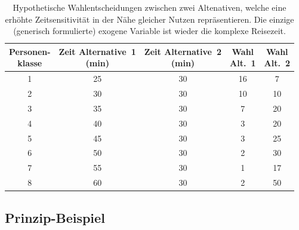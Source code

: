 \begin{table}
\begin{center}
\begin{tabular}{|c||c|c|c|c|} \hline
\myBox{4em}{Personen-\\[-3ex]klasse}
 & \myBox{8em}{Zeit Alternative~1\\(min)}
 & \myBox{8em}{Zeit Alternative~2\\(min)}
 & \myBox{2.5em}{Wahl\\Alt.~1}
 & \myBox{2.5em}{Wahl\\Alt.~2} \\ \hline
1 & 25 & 30 & 16 & 7 \\
2 & 30 & 30 & 10 & 10 \\
3 & 35 & 30 & 7 & 20 \\
4 & 40 & 30 & 3 & 20 \\
5 & 45 & 30 & 3 & 25 \\
6 & 50 & 30 & 2 & 30 \\
7 & 55 & 30 & 1 & 17 \\
8 & 60 & 30 & 2 & 50 \\ \hline
\end{tabular}
\caption{\label{tab:Tversky}Hypothetische Wahlentscheidungen zwischen
  zwei Altenativen, welche eine  erh\"ohte Zeitsensitivit\"at 
in der N\"ahe gleicher Nutzen
repr\"asentieren.
Die einzige
(generisch formulierte) exogene Variable ist wieder die komplexe Reisezeit.}
\end{center}
\end{table}

\subsection{Prinzip-Beispiel}

